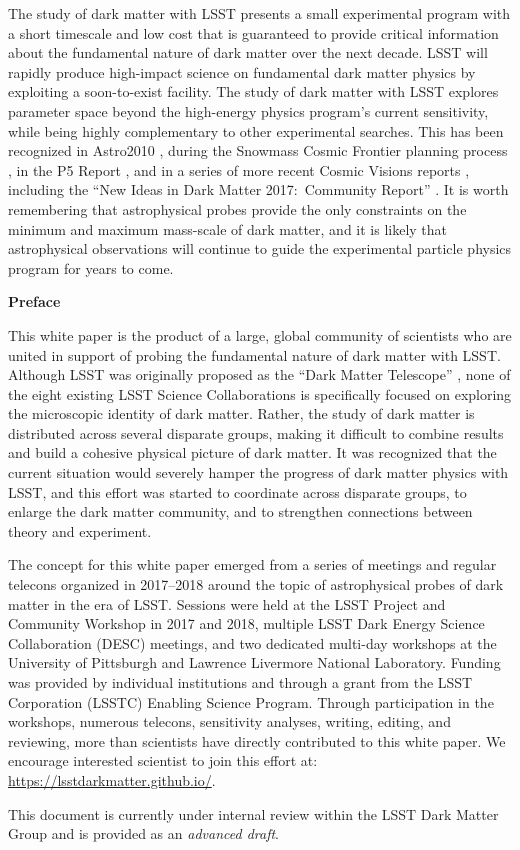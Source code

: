 The study of dark matter with LSST presents a small experimental program with a short timescale and low cost that is guaranteed to provide critical information about the fundamental nature of dark matter over the next decade.
LSST will rapidly produce high-impact science on fundamental dark matter physics by exploiting a soon-to-exist facility. 
The study of dark matter with LSST explores parameter space beyond the high-energy physics program's current sensitivity, while being highly complementary to other experimental searches. %
This has been recognized in Astro2010 \citep{Astro2010}, during the Snowmass Cosmic Frontier planning process \citep[\eg,][]{1305.1605, 1310.8642, 1310.5662}, in the P5 Report \citep[]{P5Report}, and in a series of more recent Cosmic Visions reports \citep[\eg,][]{1604.07626,1802.07216}, including the ``New Ideas in Dark Matter 2017:\ Community Report'' \citep{Battaglieri:2017aum}.
It is worth remembering that astrophysical probes provide the only constraints on the minimum and maximum mass-scale of dark matter, and it is likely that astrophysical observations will continue to guide the experimental particle physics program for years to come.

\clearpage

\begin{center}
  {\Large \bf Preface}
\end{center}

This white paper is the product of a large, global community of scientists who are united in support of probing the fundamental nature of dark matter with LSST.
Although LSST was originally proposed as the ``Dark Matter Telescope'' \citep{Tyson:2001}, none of the eight existing LSST Science Collaborations is specifically focused on exploring the microscopic identity of dark matter.
Rather, the study of dark matter is distributed across several disparate groups, making it difficult to combine results and build a cohesive physical picture of dark matter.
It was recognized that the current situation would severely hamper the progress of dark matter physics with LSST, and this effort was started to coordinate across disparate groups, to enlarge the dark matter community, and to strengthen connections between theory and experiment.

The concept for this white paper emerged from a series of meetings and regular telecons organized in 2017--2018 around the topic of astrophysical probes of dark matter in the era of LSST.
Sessions were held at the LSST Project and Community Workshop in 2017 and 2018, multiple LSST Dark Energy Science Collaboration (DESC) meetings, and two dedicated multi-day workshops at the University of Pittsburgh and Lawrence Livermore National Laboratory.
Funding was provided by individual institutions and through a grant from the LSST Corporation (LSSTC) Enabling Science Program.
Through participation in the workshops, numerous telecons, sensitivity analyses, writing, editing, and reviewing, more than  scientists have directly contributed to this white paper.
We encourage interested scientist to join this effort at: \url{https://lsstdarkmatter.github.io/}.

This document is currently under internal review within the LSST Dark Matter Group and is provided as an \emph{advanced draft}.

